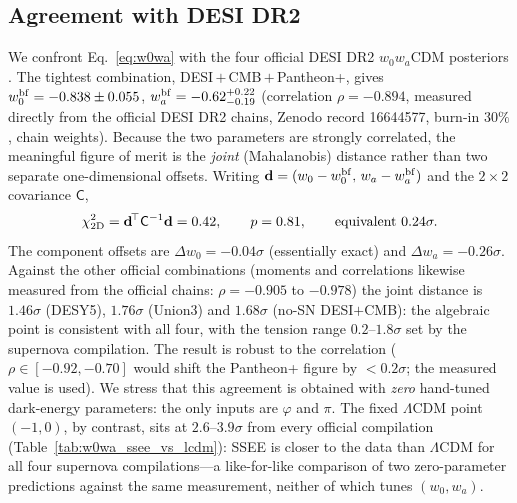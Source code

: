 \documentclass[aps,prd,preprint,amsmath,amssymb,nofootinbib,longbibliography]{revtex4-2}
\begin{document}
\subsection{Agreement with DESI DR2}
\label{sec:desi-agreement}
We confront Eq.~\eqref{eq:w0wa} with the four official DESI DR2 $w_0w_a$CDM
posteriors \citep[eqs.~25--28]{AbdulKarim2025}. The tightest combination,
DESI\,$+$\,CMB\,$+$\,Pantheon+, gives
$w_0^{\rm bf}=-0.838\pm0.055$, $w_a^{\rm bf}=-0.62^{+0.22}_{-0.19}$
(correlation $\rho=-0.894$, measured directly from the official DESI DR2
chains, Zenodo record 16644577, burn-in $30\%$, chain weights). Because the two parameters are strongly
correlated, the meaningful figure of merit is the \emph{joint} (Mahalanobis)
distance rather than two separate one-dimensional offsets. Writing
$\mathbf{d}=(w_0-w_0^{\rm bf},\,w_a-w_a^{\rm bf})$ and the $2\times2$
covariance $\mathsf{C}$,
\begin{equation}
  \chi^2_{\rm 2D}=\mathbf{d}^{\!\top}\mathsf{C}^{-1}\mathbf{d}=0.42,
  \qquad
  p=0.81,
  \qquad
  \text{equivalent } 0.24\sigma .
  \label{eq:chi2}
\end{equation}
The component offsets are $\Delta w_0=-0.04\sigma$ (essentially exact) and
$\Delta w_a=-0.26\sigma$. Against the other official combinations (moments and
correlations likewise measured from the official chains: $\rho=-0.905$ to
$-0.978$) the joint
distance is $1.46\sigma$ (DESY5), $1.76\sigma$ (Union3) and $1.68\sigma$
(no-SN DESI$+$CMB): the algebraic point is consistent with all four, with the
tension range $0.2$--$1.8\sigma$ set by the supernova compilation. The result
is robust to the correlation ($\rho\in[-0.92,-0.70]$ would shift the
Pantheon+ figure by $<0.2\sigma$; the measured value is used). We stress that this agreement is obtained
with \emph{zero} hand-tuned dark-energy parameters: the only inputs are
$\varphi$ and $\pi$. The fixed $\Lambda$CDM point $(-1,0)$, by contrast, sits at
$2.6$--$3.9\sigma$ from every official compilation
(Table~\ref{tab:w0wa_ssee_vs_lcdm}): SSEE is closer to the data than
$\Lambda$CDM for all four supernova compilations---a like-for-like comparison of
two zero-parameter predictions against the same measurement, neither of which
tunes $(w_0,w_a)$.
\end{document}
